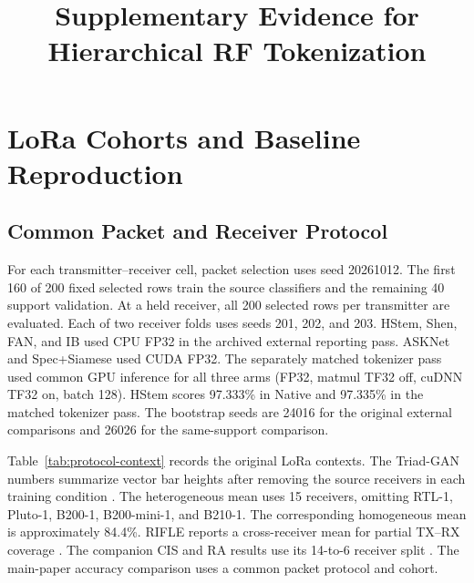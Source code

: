 \documentclass[journal]{IEEEtran}
\begin{document}
\title{Supplementary Evidence for Hierarchical RF Tokenization}
\maketitle
\setcounter{figure}{8}
\setcounter{table}{8}

\section{LoRa Cohorts and Baseline Reproduction}
\subsection{Common Packet and Receiver Protocol}
For each transmitter--receiver cell, packet selection uses seed 20261012. The first 160 of 200 fixed selected rows train the source classifiers and the remaining 40 support validation. At a held receiver, all 200 selected rows per transmitter are evaluated. Each of two receiver folds uses seeds 201, 202, and 203. HStem, Shen, FAN, and IB used CPU FP32 in the archived external reporting pass. ASKNet and Spec+Siamese used CUDA FP32. The separately matched tokenizer pass used common GPU inference for all three arms (FP32, matmul TF32 off, cuDNN TF32 on, batch 128). HStem scores 97.333\% in Native and 97.335\% in the matched tokenizer pass. The bootstrap seeds are 24016 for the original external comparisons and 26026 for the same-support comparison.

Table~\ref{tab:protocol-context} records the original LoRa contexts. The Triad-GAN numbers summarize vector bar heights after removing the source receivers in each training condition \cite{wang2026triad}. The heterogeneous mean uses 15 receivers, omitting RTL-1, Pluto-1, B200-1, B200-mini-1, and B210-1. The corresponding homogeneous mean is approximately 84.4\%. RIFLE reports a cross-receiver mean for partial TX--RX coverage \cite{zhang2026rifle}. The companion CIS and RA results use its 14-to-6 receiver split \cite{oobcompanion}. The main-paper accuracy comparison uses a common packet protocol and cohort.

\begin{table}[!t]\centering
\caption{Published and historical LoRa protocol context. Each score is tied to its own data availability and exposure.}
\label{tab:protocol-context}
\end{table}
\end{document}
